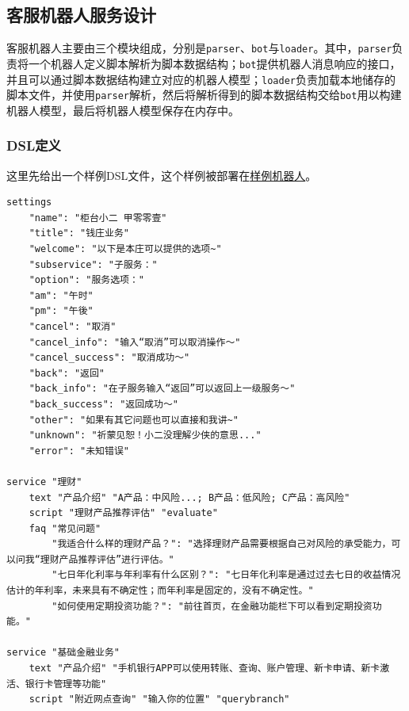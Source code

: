 \documentclass[hyperref]{ctexart}
\begin{document}
\subsection{客服机器人服务设计}
客服机器人主要由三个模块组成，分别是\texttt{parser}、\texttt{bot}与\texttt{loader}。其中，\texttt{parser}负责将一个机器人定义脚本解析为脚本数据结构；\texttt{bot}提供机器人消息响应的接口，并且可以通过脚本数据结构建立对应的机器人模型；\texttt{loader}负责加载本地储存的脚本文件，并使用\texttt{parser}解析，然后将解析得到的脚本数据结构交给\texttt{bot}用以构建机器人模型，最后将机器人模型保存在内存中。
\subsubsection{DSL定义}
\label{DSL Def}
这里先给出一个样例DSL文件，这个样例被部署在\href{https://chatbot.lab.jnn.icu/}{样例机器人}。
\begin{lstlisting}
settings
    "name": "柜台小二 甲零零壹"
    "title": "钱庄业务"
    "welcome": "以下是本庄可以提供的选项~"
    "subservice": "子服务："
    "option": "服务选项："
    "am": "午时"
    "pm": "午後"
    "cancel": "取消"
    "cancel_info": "输入“取消”可以取消操作～"
    "cancel_success": "取消成功～"
    "back": "返回"
    "back_info": "在子服务输入“返回”可以返回上一级服务～"
    "back_success": "返回成功～"
    "other": "如果有其它问题也可以直接和我讲~"
    "unknown": "祈蒙见恕！小二没理解少侠的意思..."
    "error": "未知错误"

service "理财"
    text "产品介绍" "A产品：中风险...; B产品：低风险; C产品：高风险"
    script "理财产品推荐评估" "evaluate"
    faq "常见问题"
        "我适合什么样的理财产品？": "选择理财产品需要根据自己对风险的承受能力，可以问我“理财产品推荐评估”进行评估。"
        "七日年化利率与年利率有什么区别？": "七日年化利率是通过过去七日的收益情况估计的年利率，未来具有不确定性；而年利率是固定的，没有不确定性。"
        "如何使用定期投资功能？": "前往首页，在金融功能栏下可以看到定期投资功能。"

service "基础金融业务"
    text "产品介绍" "手机银行APP可以使用转账、查询、账户管理、新卡申请、新卡激活、银行卡管理等功能"
    script "附近网点查询" "输入你的位置" "querybranch"
\end{lstlisting}
\end{document}
